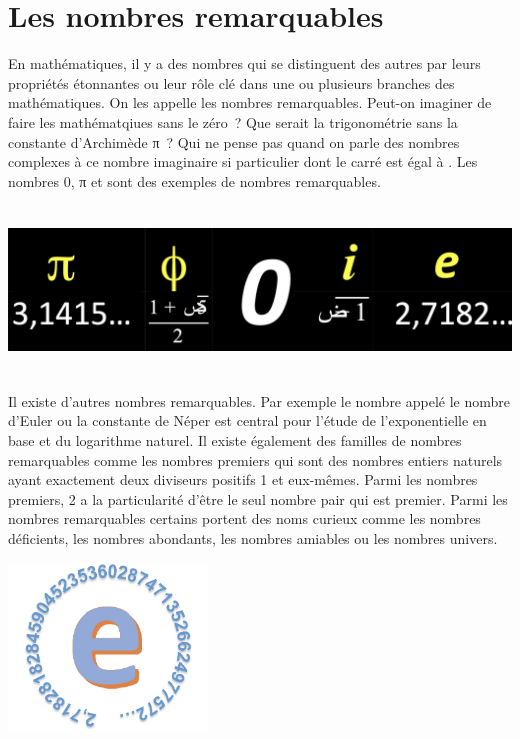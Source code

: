 \documentclass[
  10pt,
  french,
  a5paper,
  openany]{book}
\begin{document}
\hypertarget{les-nombres-remarquables}{%
\chapter{Les nombres remarquables}\label{les-nombres-remarquables}}

En mathématiques, il y a des nombres qui se distinguent des autres par leurs propriétés étonnantes ou leur rôle clé dans une ou plusieurs branches des mathématiques. On les appelle les nombres remarquables.
Peut-on imaginer de faire les mathématqiues sans le zéro~? Que serait la trigonométrie sans la constante d'Archimède π~? Qui ne pense pas quand on parle des nombres complexes à ce nombre imaginaire si particulier dont le carré est égal à . Les nombres 0, π et sont des exemples de nombres remarquables.

\begin{center}
\includegraphics[width=\textwidth,height=12em]{images/les-nombres-remarquables-1.jpg}

\end{center}

Il existe d'autres nombres remarquables. Par exemple le nombre appelé le nombre d'Euler ou la constante de Néper est central pour l'étude de l'exponentielle en base et du logarithme naturel. Il existe également des familles de nombres remarquables comme les nombres premiers qui sont des nombres entiers naturels ayant exactement deux diviseurs positifs 1 et eux-mêmes. Parmi les nombres premiers, 2 a la particularité d'être le seul nombre pair qui est premier. Parmi les nombres remarquables certains portent des noms curieux comme les nombres déficients, les nombres abondants, les nombres amiables ou les nombres univers.

\begin{center}
\includegraphics[width=\textwidth,height=12em]{images/les-nombres-remarquables-2.jpg}

\end{center}
\end{document}
